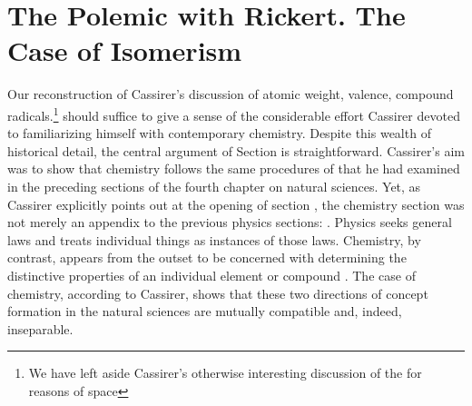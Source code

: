 \documentclass[submitted,12pt]{article}
\begin{document}


\section{The Polemic with Rickert. The Case of Isomerism}
\label{sec:rickert}



Our reconstruction of Cassirer's discussion of atomic weight, valence, compound radicals\etc.\footnote{We have left aside Cassirer's otherwise interesting discussion of the  for reasons of space } should suffice to give a sense of the considerable effort Cassirer devoted to familiarizing himself with contemporary chemistry. Despite this wealth of historical detail, the central argument of Section  is straightforward. Cassirer's aim was to show that chemistry follows the same procedures of   that he had examined in the preceding sections of the fourth chapter on natural sciences. Yet, as Cassirer explicitly points out at the opening of section , the chemistry section was not merely an appendix to the previous physics sections:  . Physics seeks general laws and treats individual things as instances of those laws. Chemistry, by contrast, appears from the outset to be concerned with determining the distinctive properties of an individual element or compound  . The case of chemistry, according to Cassirer, shows that these two directions of concept formation in the natural sciences are mutually compatible and, indeed, inseparable. 


\end{document}
